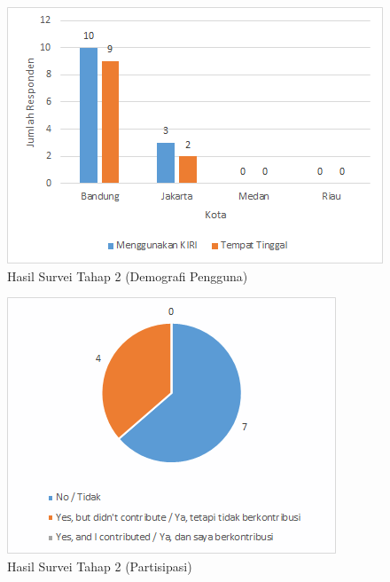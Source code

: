 \begin{figure}
	\centering
	\includegraphics[scale=0.75]{Gambar/5_hasilsurvei_2_2}
	\caption{Hasil Survei Tahap 2 (Demografi Pengguna)} 
	\label{fig:5_hasilsurvei_2_2}
\end{figure}

\begin{figure}
	\centering
	\includegraphics[scale=0.75]{Gambar/5_hasilsurvei_2_3}
	\caption{Hasil Survei Tahap 2 (Partisipasi)} 
	\label{fig:5_hasilsurvei_2_3}
\end{figure}